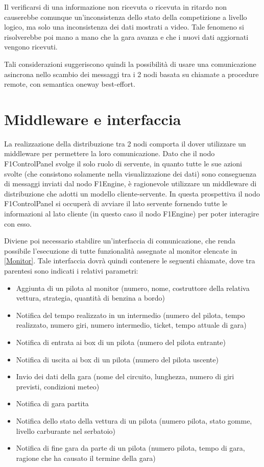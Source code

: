 \documentclass[a4paper,11pt, twoside, openright]{book}
\begin{document}
      Il verificarsi di una informazione non ricevuta o ricevuta in ritardo 
      non causerebbe comunque un'inconsistenza dello stato della competizione a livello logico,
      ma solo una inconsistenza dei dati mostrati a video. Tale fenomeno si risolverebbe poi mano a mano che la gara avanza
      e che i nuovi dati aggiornati vengono ricevuti.
      
      Tali considerazioni suggeriscono quindi la possibilità di usare una comunicazione asincrona nello scambio dei messaggi
      tra i 2 nodi basata su chiamate a procedure remote, con semantica oneway best-effort.
      
    \section{Middleware e interfaccia}
      La realizzazione della distribuzione tra 2 nodi comporta il dover utilizzare un middleware
      per permettere la loro comunicazione.
      Dato che il nodo F1ControlPanel svolge il solo ruolo di servente, in quanto tutte le sue azioni svolte 
      (che consistono solamente nella visualizzazione dei dati)
      sono conseguenza di messaggi inviati dal nodo F1Engine, è ragionevole utilizzare un middleware di distribuzione
      che adotti un modello cliente-servente. In questa prospettiva il nodo F1ControlPanel si occuperà
      di avviare il lato servente
      fornendo tutte le informazioni al lato cliente (in questo caso il nodo F1Engine) per poter interagire con esso.
      
      Diviene poi necessario stabilire un'interfaccia di comunicazione, che renda possibile l'esecuzione
      di tutte funzionalità assegnate al monitor elencate in \ref{Monitor}. Tale interfaccia dovrà quindi contenere
      le seguenti chiamate, dove tra parentesi sono indicati i relativi parametri:
      
    \begin{itemize}
      \item Aggiunta di un pilota al monitor (numero, nome, costruttore della relativa vettura, strategia, quantità di benzina a bordo)
      \item Notifica del tempo realizzato in un intermedio (numero del pilota, tempo realizzato, numero giri, numero intermedio, 
            ticket, tempo attuale di gara)
      \item Notifica di entrata ai box di un pilota (numero del pilota entrante)
      \item Notifica di uscita ai box di un pilota (numero del pilota uscente)
      \item Invio dei dati della gara (nome del circuito, lunghezza, numero di giri previsti, condizioni meteo)
      \item Notifica di gara partita
      \item Notifica dello stato della vettura di un pilota (numero pilota, stato gomme, livello carburante nel serbatoio)
      \item Notifica di fine gara da parte di un pilota (numero pilota, tempo di gara, ragione che ha causato il termine della gara)
    \end{itemize}
\end{document}
